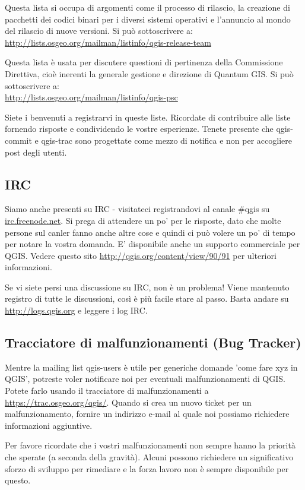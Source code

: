 Questa lista si occupa di argomenti come il processo di rilascio, la creazione di pacchetti dei codici binari per i diversi sistemi operativi e l'annuncio al  mondo del rilascio di nuove versioni. Si può sottoscrivere a:\\
\url{http://lists.osgeo.org/mailman/listinfo/qgis-release-team}

Questa lista è usata per discutere questioni di pertinenza della Commissione Direttiva, cioè inerenti la generale gestione e direzione di Quantum GIS. Si può sottoscrivere a:\\
\url{http://lists.osgeo.org/mailman/listinfo/qgis-psc}

Siete i benvenuti a registrarvi in queste liste. Ricordate di contribuire alle liste fornendo risposte e condividendo le vostre esperienze. Tenete presente che qgis-commit e qgis-trac sono progettate come mezzo di notifica e non per accogliere post degli utenti. 

\subsection{IRC}
Siamo anche presenti su IRC - visitateci registrandovi al canale \#qgis su
\url{irc.freenode.net}. Si prega di attendere un po' per le risposte, dato che molte persone sul canler fanno anche altre cose e quindi ci può volere un po' di tempo per notare la vostra domanda. E' disponibile anche un supporto commerciale per QGIS. Vedere questo sito \url{http://qgis.org/content/view/90/91} per ulteriori informazioni.

Se vi siete persi una discussione su IRC, non è un problema! Viene mantenuto registro di tutte le discussioni, così è più facile stare al passo. Basta andare su \url{http://logs.qgis.org} e leggere i log IRC.

\subsection{Tracciatore di malfunzionamenti (Bug Tracker)}
Mentre la mailing list qgis-users è utile per generiche domande 'come fare xyz in
QGIS', potreste voler notificare noi per eventuali malfunzionamenti di QGIS. Potete farlo usando il tracciatore di malfunzionamenti a \url{https://trac.osgeo.org/qgis/}. Quando si crea un nuovo ticket per un malfunzionamento, fornire un indirizzo e-mail al quale noi possiamo richiedere informazioni aggiuntive.

Per favore ricordate che i vostri malfunzionamenti non sempre hanno la priorità che sperate (a seconda della gravità). Alcuni possono richiedere un significativo sforzo di sviluppo per rimediare e la forza lavoro non è sempre disponibile per questo.

